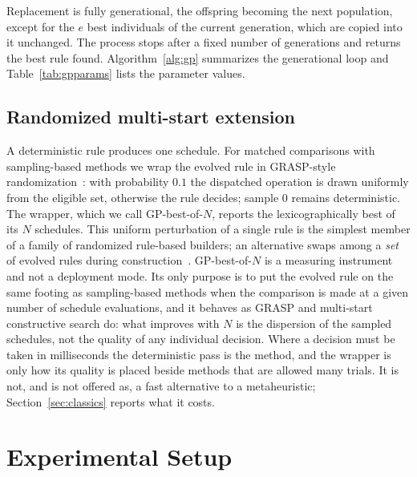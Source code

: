 \documentclass[review,authoryear,11pt]{elsarticle}
\newcommand{\rev}[1]{\textcolor{revcolor}{#1}}
\begin{document}
Replacement is fully generational, the offspring becoming the next
population, except for the $e$ best individuals of the current
generation, which are copied into it unchanged. The process stops after
a fixed number of generations and returns the best rule found.
Algorithm~\ref{alg:gp} summarizes the generational loop and
Table~\ref{tab:gpparams} lists the parameter values.



\subsection{Randomized multi-start extension}
\label{sec:grasp}
A deterministic rule produces one schedule. For matched comparisons with
sampling-based methods we wrap the evolved rule in GRASP-style
randomization~\citep{Feo1995}: with probability $0.1$ the dispatched operation is
drawn uniformly from the eligible set, otherwise the rule decides;
sample $0$ remains deterministic. The wrapper, which we call
GP-best-of-$N$, reports the lexicographically best of its $N$
schedules. This uniform perturbation of a single
rule is the simplest member of a family of randomized rule-based
builders; an alternative swaps among a \emph{set} of evolved rules
during construction~\citep{GilGala2025GRASB}.
\rev{GP-best-of-$N$ is a measuring instrument and not a deployment
mode. Its only purpose is to put the evolved rule on the same footing as
sampling-based methods when the comparison is made at a given number of
schedule evaluations, and it behaves as GRASP and multi-start
constructive search do: what improves with $N$ is the dispersion of the
sampled schedules, not the quality of any individual decision. Where a
decision must be taken in milliseconds the deterministic pass is the
method, and the wrapper is only how its quality is placed beside methods
that are allowed many trials. It is not, and is not offered as, a fast
alternative to a metaheuristic; Section~\ref{sec:classics} reports what
it costs.}

\section{Experimental Setup}
\label{sec:setup}
\end{document}
